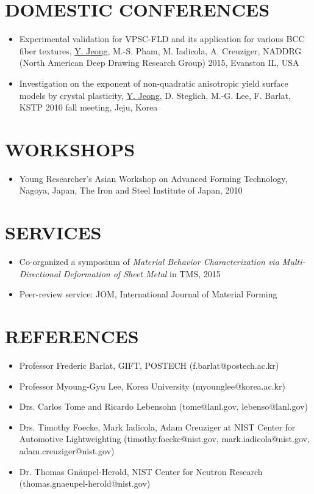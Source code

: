 \documentclass{res}
\begin{document}
\begin{resume}
  \section{DOMESTIC CONFERENCES}
  \begin{itemize}
  \item Experimental validation for VPSC-FLD and its application for various BCC fiber textures, \underline{Y. Jeong}, M.-S. Pham, M. Iadicola, A. Creuziger, NADDRG (North American Deep Drawing Research Group) 2015, Evanston IL, USA
  \item Investigation on the exponent of non-quadratic anisotropic yield surface models by crystal plasticity, \underline{Y. Jeong}, D. Steglich, M.-G. Lee, F. Barlat, KSTP 2010 fall meeting, Jeju, Korea
  \end{itemize}

  \section{WORKSHOPS}
  \begin{itemize}
  \item Young Researcher's Asian Workshop on Advanced Forming Technology, Nagoya, Japan, The Iron and Steel Institute of Japan, 2010
  \end{itemize}

  \section{SERVICES}
  \begin{itemize}
  \item Co-organized a symposium of {\it Material Behavior Characterization via Multi-Directional Deformation of Sheet Metal} in TMS, 2015
  \item Peer-review service: JOM, International Journal of Material Forming
  \end{itemize}

  \section{REFERENCES}
  \begin{itemize}
  \item Professor Frederic Barlat, GIFT, POSTECH (f.barlat@postech.ac.kr)
  \item Professor Myoung-Gyu Lee, Korea University (myounglee@korea.ac.kr)
  \item Drs. Carlos Tome and Ricardo Lebensohn (tome@lanl.gov, lebenso@lanl.gov)
  \item Drs. Timothy Foecke, Mark Iadicola, Adam Creuziger at NIST Center for Automotive Lightweighting (timothy.foecke@nist.gov, mark.iadicola@nist.gov, adam.creuziger@nist.gov)
  \item Dr. Thomas Gn\"aupel-Herold, NIST Center for Neutron Research (thomas.gnaeupel-herold@nist.gov)
  \end{itemize}

\end{resume}
\end{document}
